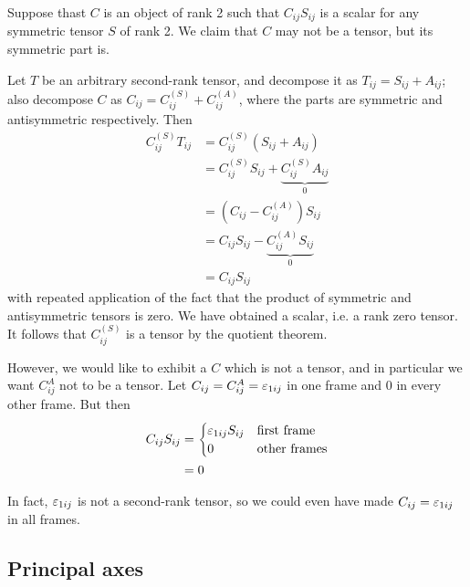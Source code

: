\documentclass{../../template/note}
\begin{document}
    
    \begin{example*}[hard]
        Suppose thast \(C\) is an object of rank 2 such that \(C_{ij}S_{ij}\) is a scalar for any symmetric tensor \(S\) of rank 2. We claim that \(C\) may not be a tensor, but its symmetric part is.

        Let \(T\) be an arbitrary second-rank tensor, and decompose it as \(T_{ij} = S_{ij} + A_{ij}\); also decompose \(C\) as \(C_{ij} = C^{(S)}_{ij} + C^{(A)}_{ij}\), where the parts are symmetric and antisymmetric respectively. Then
        \begin{align*}
            C^{(S)}_{ij}T_{ij} &= C^{(S)}_{ij}(S_{ij}+A_{ij}) \\
            &= C^{(S)}_{ij}S_{ij} + \underbrace{C^{(S)}_{ij}A_{ij}}_0 \\
            &= \left(C_{ij} - C^{(A)}_{ij}\right)S_{ij} \\
            &= C_{ij}S_{ij} - \underbrace{C^{(A)}_{ij}S_{ij}}_0 \\
            &= C_{ij}S_{ij}
        \end{align*}
        with repeated application of the fact that the product of symmetric and antisymmetric tensors is zero. We have obtained a scalar, i.e. a rank zero tensor. It follows that \(C^{(S)}_{ij}\) is a tensor by the quotient theorem.

        However, we would like to exhibit a \(C\) which is not a tensor, and in particular we want \(C^{A}_{ij}\) not to be a tensor. Let \(C_{ij} = C^{A}_{ij} = \varepsilon_{1ij}\) in one frame and 0 in every other frame. But then
        \begin{align*}
            C_{ij}S_{ij} &= \begin{cases}
                \varepsilon_{1ij}S_{ij} & \text{first frame} \\
                0 & \text{other frames}
            \end{cases} \\
            &= 0
        \end{align*}        
    \end{example*}
    
    \begin{remark*}
        In fact, \(\varepsilon_{1ij}\) is not a second-rank tensor, so we could even have made \(C_{ij} = \varepsilon_{1ij}\) in all frames.
    \end{remark*}
    
    \subsection{Principal axes}
\end{document}
